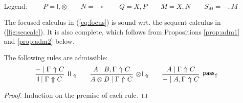 \documentclass[runningheads]{llncs}
\newcommand{\tl}{\otimes \mathsf{L}}
\newcommand{\tr}{\otimes \mathsf{R}}
\newcommand{\lleft}{{\multimap}\mathsf{L}}
\newcommand{\pass}{\mathsf{pass}}
\newcommand{\M}{\mathsf{M}}
\newcommand{\unitl}{\mathsf{IL}}
\newcommand{\unitr}{\mathsf{IR}}
\newcommand{\IR}{\unitr}
\newcommand{\ot}{\otimes}
\newcommand{\lolli}{\multimap}
\newcommand{\I}{\mathsf{I}}
\newcommand{\LI}{\mathsf{LI}}
\newcommand{\Pass}{\mathsf{P}}
\newcommand{\xvdash}{\vdash^{x}}
\newcommand{\niccolo}[1]{{\color{red}\textbf{Niccol{\`o}: }#1}}
\newcommand{\up}{\Uparrow}
\newcommand{\dn}{\Downarrow}
\newcommand{\sw}{\mathsf{sw}}
\newcommand{\unfocLR}{\mathsf{blur_{M}}}
\begin{document}
\begin{equation}
\begin{array}{c}
  \end{array}
\end{equation}
Legend: $\qquad P = \I,\ot
\qquad
N = \lolli
\qquad
Q = X,P
\qquad
M = X,N
\qquad
S_M = -,M$

The focused calculus in (\ref{eq:focus}) is sound wrt. the sequent calculus in (\ref{fig:seqcalc}). It
is also complete, which follows from Propositions \ref{prop:adm1}
and \ref{prop:adm2} below.
\begin{proposition}\label{prop:adm1}
  The following rules are admissible:
  \[
      \infer[\unitl_\up]{\I \mid \Gamma \up C}{- \mid \Gamma \up C}
    \qquad
    \infer[\tl_\up]{A \ot B \mid\Gamma \up C}{A \mid B , \Gamma \up C}
    \qquad
    \infer[\pass_\up]{- \mid A , \Gamma \up C }{
      A\mid \Gamma \up C
    }
    \]
\end{proposition}
\begin{proof}
  Induction on the premise of each rule.
\end{proof}
\end{document}
